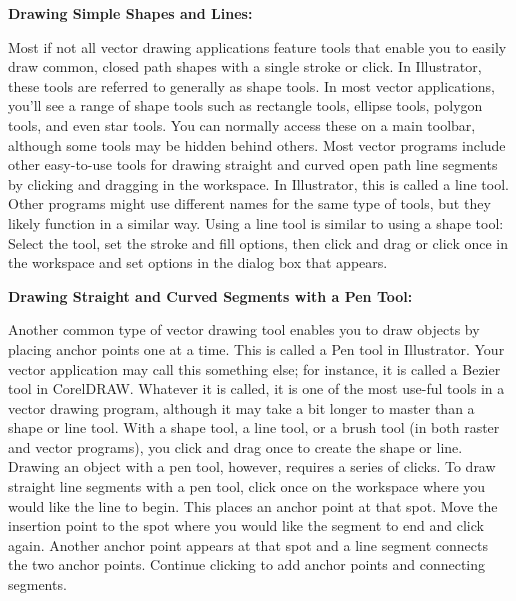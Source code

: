 \documentclass{report}
\begin{document}
    \bigbreak \noindent \bigbreak \noindent 
    \begin{large}
      \textbf{Drawing Simple Shapes and Lines:}
    \end{large}
    \bigbreak \noindent 
    Most if not all vector drawing applications feature tools that enable you to easily draw common, closed path shapes with a single stroke or click. In Illustrator, these tools are referred to generally as shape tools. In most vector applications, you’ll see a range of shape tools such as rectangle tools, ellipse tools, polygon tools, and even star tools. You can normally access these on a main toolbar, although some tools may be hidden behind others.
    \bigbreak \noindent 
    Most vector programs include other easy-to-use tools for drawing straight and curved open path line segments by clicking and dragging in the workspace. In Illustrator, this is called a line tool.
    \bigbreak \noindent 
    Other programs might use different names for the same type of tools, but they likely function in a similar way. Using a line tool is similar to using a shape tool: Select the tool, set the stroke and fill options, then click and drag or click once in the workspace and set options in the dialog box that appears.
    \bigbreak \noindent 

    \pagebreak \bigbreak \noindent
    \begin{large}
      \textbf{Drawing Straight and Curved Segments with a Pen Tool:}
    \end{large}
    \bigbreak \noindent 
    Another common type of vector drawing tool enables you to draw objects by placing anchor points one at a time. This is called a Pen tool in Illustrator. Your vector application may call this something else; for instance, it is called a Bezier tool in CorelDRAW. Whatever it is called, it is one of the most use-ful tools in a vector drawing program, although it may take a bit longer to master than a shape or line tool. With a shape tool, a line tool, or a brush tool (in both raster and vector programs), you click and drag once to create the shape or line. Drawing an object with a pen tool, however, requires a series of clicks. To draw straight line segments with a pen tool, click once on the workspace where you would like the line to begin. This places an anchor point at that spot. Move the insertion point to the spot where you would like the segment to end and click again. Another anchor point appears at that spot and a line segment connects the two anchor points. Continue clicking to add anchor points and connecting segments.
  
\end{document}
